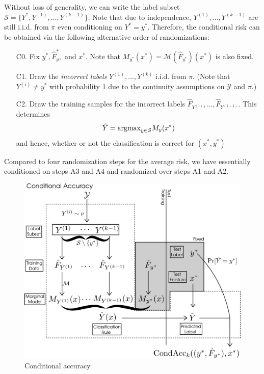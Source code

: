 \documentclass[12pt]{article}
\begin{document}
Without loss of generality, we can write the label subset $\mathcal{S}
= \{Y^*, Y^{(1)},\hdots, Y^{(k-1)}\}$.  Note that due to independence,
$Y^{(1)},\hdots, Y^{(k-1)}$ are still i.i.d. from $\pi$ even
conditioning on $Y^* = y^*.$ Therefore, the conditional risk can be
obtained via the following alternative order of randomizations:
\begin{enumerate}
\item[C0.] 
Fix $y^*, \hat{F}_y^*,$ and $x^*$.  Note that $M_{y^*}(x^*)
= \mathcal{M}(\hat{F}_{y^*})(x^*)$ is also fixed.
\item[C1.]
Draw the \emph{incorrect labels} $Y^{(1)},\hdots, Y^{(k)}$ i.i.d. from
$\pi$.  (Note that $Y^{(i)} \neq y^*$ with probability 1 due to the
continuity assumptions on $\mathcal{Y}$ and $\pi$.)
\item[C2.]
Draw the training samples for the incorrect labels
$\hat{F}_{Y^{(1)}},\hdots, \hat{F}_{Y^{(k-1)}}$.  This determines
\[
\hat{Y} = \text{argmax}_{y \in \mathcal{S}} M_y(x^*)
\]
and hence, whether or not the classification is correct for $(x^*, y^*)$
\end{enumerate}
Compared to four randomization steps for the average risk, we have
essentially conditioned on steps A3 and A4 and randomized over steps
A1 and A2.

\begin{figure}[h]
\centering
\includegraphics[scale = 0.3]{conditional_risk.png}
\caption{Conditional accuracy}\label{fig:conditional_risk}
\end{figure}
\end{document}
